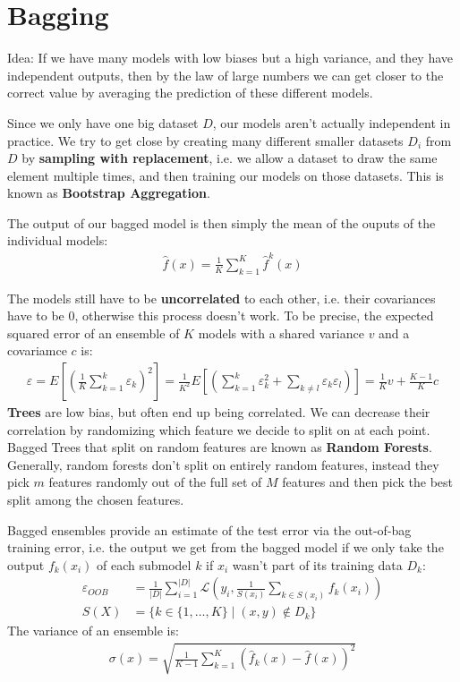 \documentclass{report}
\renewcommand\epsilon{\varepsilon}
\newcommand{\tbf}{\textbf}
\newcommand*{\newpar}{\par\vspace{\baselineskip}\noindent}
\newcommand{\loss}{\mathcal{L}}
\begin{document}
\section{Bagging}
Idea: If we have many models with low biases but a high variance, and they have independent outputs, then by the law of large numbers we can get closer to the correct value by averaging the prediction of these different models.
\newpar
Since we only have one big dataset $D$, our models aren't actually independent in practice. We try to get close by creating many different smaller datasets $D_i$ from $D$ by \tbf{sampling with replacement}, i.e. we allow a dataset to draw the same element multiple times, and then training our models on those datasets. This is known as \tbf{Bootstrap Aggregation}.
\newpar
The output of our bagged model is then simply the mean of the ouputs of the individual models:
\begin{align}
 \hat{f}(x) = \frac{1}{K} \sum_{k=1}^K \hat{f}^k(x)
\end{align}
\newpar
The models still have to be \tbf{uncorrelated} to each other, i.e. their covariances have to be $0$, otherwise this process doesn't work. To be precise, the expected squared error of an ensemble of $K$ models with a shared variance $v$ and a covariamce $c$ is:
\begin{align}
 \epsilon = E\left[\left(\frac{1}{K}\sum_{k=1}^k \epsilon_k\right)^2\right] = \frac{1}{K^2}E\left[\left(\sum_{k=1}^k \epsilon_k^2 + \sum_{k \neq l} \epsilon_k \epsilon_l\right)\right] = \frac{1}{K}v + \frac{K-1}{K}c
\end{align}
\tbf{Trees} are low bias, but often end up being correlated. We can decrease their correlation by randomizing which feature we decide to split on at each point. Bagged Trees that split on random features are known as \tbf{Random Forests}. Generally, random forests don't split on entirely random features, instead they pick $m$ features randomly out of the full set of $M$ features and then pick the best split among the chosen features.
\newpar
Bagged ensembles provide an estimate of the test error via the out-of-bag training error, i.e. the output we get from the bagged model if we only take the output $f_k(x_i)$ of each submodel $k$ if $x_i$ wasn't part of its training data $D_k$:
\begin{align}
 \epsilon_{OOB}& = \frac{1}{|D|} \sum_{i=1}^{|D|} \loss\left(y_i, \frac{1}{S(x_i)} \sum_{k \in S(x_i)}f_k(x_i)\right)\\
 S(X) &= \{k \in \{1, \hdots, K\} \mid (x,y) \notin D_{k}\}
\end{align}
The variance of an ensemble is:
\begin{align}
 \sigma(x) = \sqrt{\frac{1}{K-1}\sum_{k=1}^K \left(\hat{f}_k(x) -\hat{f}(x)\right)^2}
\end{align}
%
\end{document}
